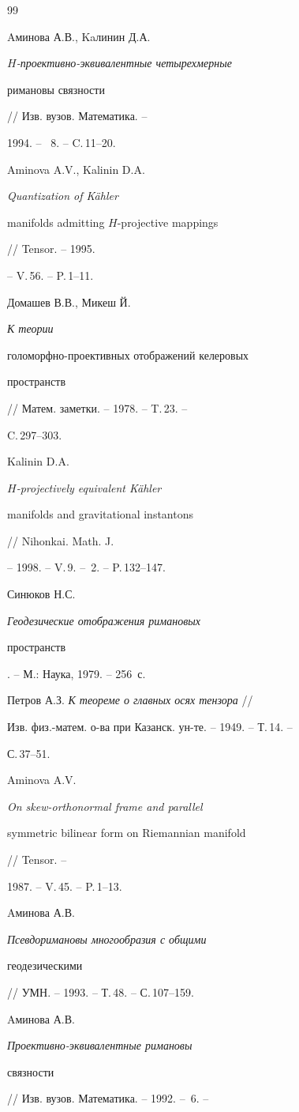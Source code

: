 \begin{thebibliography}{99}





 Aминова А.В., Kaлинин Д.А.


{\em $H$-проективно-эквивалентные четырехмерные


римановы связности} // Изв. вузов. Математика. --


1994. -- \No\, 8. -- C.\,11--20.


 Aminova A.V., Kalinin D.A. {\em Quantization of K\"ahler


manifolds admitting $H$-projective mappings} // Tensor. -- 1995.


-- V.\,56. -- P.\,1--11.


 Домашев В.В., Микеш Й. {\em К теории


голоморфно-проективных отображений келеровых


пространств} // Матем. заметки. -- 1978. -- T.\,23. --


C.\,297--303.


 Kalinin D.A. {\em $H$-projectively equivalent K\"ahler


manifolds and gravitational instantons} // Nihonkai. Math. J.


-- 1998. -- V.\,9. -- \No\,2. -- P.\,132--147.


 Синюков Н.С. {\em Геодезические отображения римановых


пространств}. -- М.: Наука, 1979. -- 256~с.


 Петров А.З. {\em К теореме о главных осях тензора} //


Изв. физ.-матем. о-ва при Казанск. ун-те. -- 1949. -- Т.\,14. --


С.\,37--51.


 Aminova A.V. {\em On skew-orthonormal frame and parallel


symmetric bilinear form on Riemannian manifold} // Tensor. --


1987. -- V.\,45. -- P.\,1--13.


 Aминова А.В. {\em Псевдоримановы многообразия с общими


геодезическими} // УМН. -- 1993. -- Т.\,48. -- С.\,107--159.


 Aминова А.В. {\em Проективно-эквивалентные римановы


связности} // Изв. вузов. Математика. -- 1992. -- \No\,6. --



\end{thebibliography}
